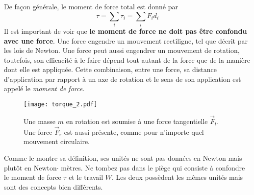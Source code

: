 \documentclass[titlepage,oneside,a4paper,11pt]{book} %
\begin{document}
De façon générale, le moment de force total est donné par
\begin{equation}
\tau = \sum_i \tau_i = \sum_i F_id_i
\end{equation}
Il est important de voir que \textbf{le moment de force ne doit pas être confondu avec une force}. Une force engendre un mouvement rectiligne, tel que décrit par les lois de Newton. Une force peut aussi engendrer un mouvement de rotation, toutefois, son efficacité à le faire dépend tout autant de la force que de la manière dont elle est appliquée. Cette combinaison, entre une force, sa distance d'application par rapport à un axe de rotation et le sens de son application est appelé le \emph{moment de force}.\\
\begin{wrapfigure}{r}{0.4\textwidth}
  \begin{center}
    \texttt{[image: torque\_2.pdf]}
  \end{center}
  \caption{Une masse $m$ en rotation est soumise à une force tangentielle $\vec{F}_t$. Une force $\vec{F}_r$ est aussi présente, comme pour n'importe quel mouvement circulaire.}
\end{wrapfigure}
Comme le montre sa définition, ses unités ne sont pas données en Newton mais plutôt en Newton$\cdot$ mètres. Ne tombez pas dans le piège qui consiste à confondre le moment de force $\tau$ et le travail $W$. Les deux possèdent les mêmes unités mais sont des concepts bien différents.\\
\end{document}
